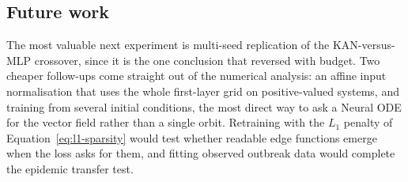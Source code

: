 \subsection{Future work}

The most valuable next experiment is multi-seed replication of the
KAN-versus-MLP crossover, since it is the one conclusion that reversed with
budget. Two cheaper follow-ups come straight out of the numerical analysis:
an affine input normalisation that uses the whole first-layer grid on
positive-valued systems, and training from several initial conditions, the
most direct way to ask a Neural ODE for the vector field rather than a
single orbit. Retraining with the $L_1$ penalty of
Equation~\ref{eq:l1-sparsity} would test whether readable edge functions
emerge when the loss asks for them, and fitting observed outbreak data would
complete the epidemic transfer test.
